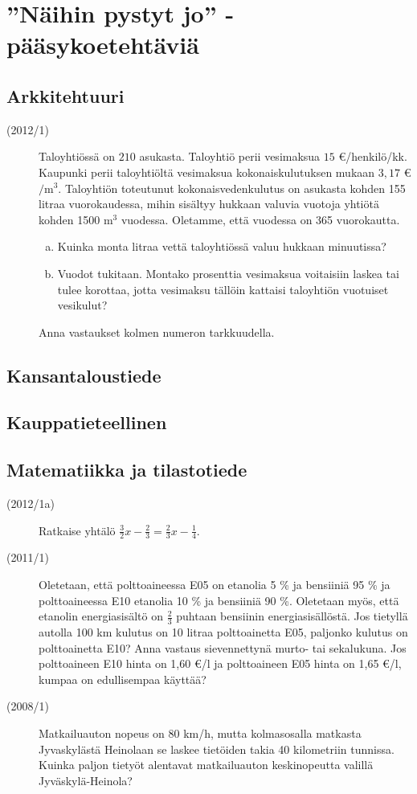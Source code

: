 \chapter{''Näihin pystyt jo'' -pääsykoetehtäviä}

\section{Arkkitehtuuri}

\begin{description}
\item[(2012/1)] Taloyhtiössä on $210$ asukasta. Taloyhtiö perii vesimaksua $15$ \euro/henkilö/kk.
Kaupunki perii taloyhtiöltä vesimaksua kokonaiskulutuksen mukaan $3,17$ \euro $/ \mathrm{m}^3$.
Taloyhtiön toteutunut kokonaisvedenkulutus on asukasta kohden 155 litraa vuorokaudessa, mihin sisältyy hukkaan valuvia vuotoja yhtiötä kohden 1500 $\mathrm{m}^3$ vuodessa. Oletamme, että vuodessa on 365 vuorokautta.
\begin{enumerate}[(a)]
\item Kuinka monta litraa vettä taloyhtiössä valuu hukkaan minuutissa?
\item Vuodot tukitaan. Montako prosenttia vesimaksua voitaisiin laskea tai tulee korottaa, jotta vesimaksu tällöin kattaisi taloyhtiön vuotuiset vesikulut?
\end{enumerate}
Anna vastaukset kolmen numeron tarkkuudella.
\end{description}

\section{Kansantaloustiede}

\section{Kauppatieteellinen}

\section{Matematiikka ja tilastotiede}

\begin{description}
	\item[(2012/1a)] Ratkaise yhtälö $\frac{3}{2}x - \frac{2}{3} = \frac{2}{3}x - \frac{1}{4}$.
	\item[(2011/1)] Oletetaan, että polttoaineessa E05 on etanolia 5 \% ja bensiiniä 95 \% ja polttoaineessa E10 etanolia 			10 \% ja bensiiniä 90 \%. Oletetaan myös, että etanolin energiasisältö on $\frac{2}{3}$ puhtaan bensiinin
		energiasisällöstä. Jos tietyllä autolla 100 km kulutus on 10 litraa polttoainetta E05, paljonko kulutus on 
		polttoainetta E10? Anna vastaus sievennettynä murto- tai sekalukuna. Jos polttoaineen 
		E10 hinta on 1,60 €/l ja polttoaineen E05 hinta on 1,65 €/l, kumpaa on edullisempaa käyttää?
	\item[(2008/1)] Matkailuauton nopeus on 80 km/h, mutta kolmasosalla matkasta Jyvaskylästä Heinolaan se laskee tietöiden takia 40 kilometriin tunnissa. Kuinka paljon tietyöt alentavat matkailuauton keskinopeutta valillä Jyväskylä-Heinola?
\end{description}

